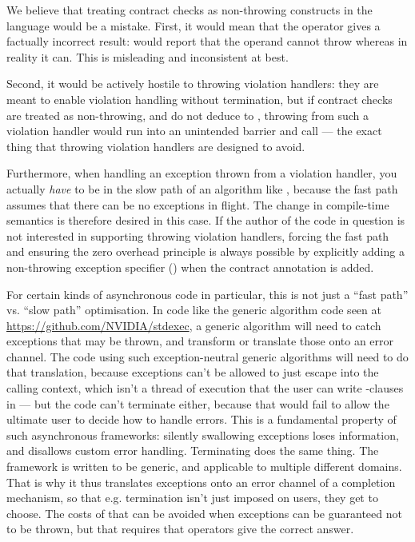 We believe that treating contract checks as non-throwing constructs in the language would be a mistake. First, it would mean that the  operator gives a factually incorrect result: \mbox{} would report that the operand cannot throw whereas in reality it can. This is misleading and inconsistent at best.

Second, it would be actively hostile to throwing violation handlers: they are meant to enable violation handling without termination, but if contract checks are treated as non-throwing, and do not deduce to , throwing from such a violation handler would run into an unintended  barrier and call  --- the exact thing that throwing violation handlers are designed to avoid.

Furthermore, when handling an exception thrown from a violation handler, you actually \emph{have} to be in the slow path of an algorithm like , because the fast path assumes that there can be no exceptions in flight. The change in compile-time semantics is therefore desired in this case. If the author of the code in question is not interested in supporting throwing violation handlers, forcing the fast path and ensuring the zero overhead principle is always possible by explicitly adding a non-throwing exception specifier () when the contract annotation is added.

For certain kinds of asynchronous code in particular, this is not just a ``fast path'' vs. ``slow path'' optimisation. In code like the generic algorithm code seen at \href{https://github.com/NVIDIA/stdexec}{https://github.com/NVIDIA/stdexec}, a generic algorithm will need to catch exceptions that may be thrown, and transform or translate those onto an error channel. The code using such  exception-neutral generic algorithms will need to do that translation, because exceptions can’t be allowed to just escape into the calling context, which isn’t a thread of execution that the user can write -clauses in --- but the code can’t terminate either, because that would fail to allow the ultimate user to decide how to handle errors. This is a fundamental property of such asynchronous frameworks: silently swallowing exceptions loses information, and disallows custom error handling. Terminating does the same thing. The framework is written to be generic, and applicable to multiple different domains. That is why it thus translates exceptions onto an error channel of a completion mechanism, so that e.g. termination isn’t just imposed on users, they get to choose. The costs of that can be avoided when exceptions can be guaranteed not to be thrown, but that requires that  operators give the correct answer.

